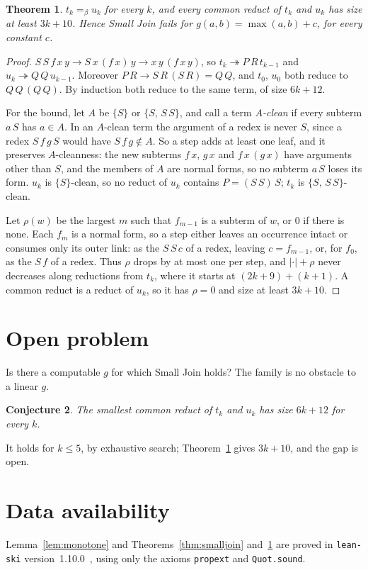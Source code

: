 \documentclass[11pt]{amsart}
\newtheorem{theorem}{Theorem}
\newtheorem{conjecture}[theorem]{Conjecture}
\theoremstyle{definition}
\newcommand{\conv}{=_{\beta}}
\newcommand{\sz}[1]{|#1|}
\begin{document}
\begin{theorem}\label{thm:lower}
$t_k\conv u_k$ for every $k$, and every common reduct of $t_k$ and $u_k$ has size at least $3k+10$.
Hence Small Join fails for $g(a,b)=\max(a,b)+c$, for every constant $c$.
\end{theorem}
\begin{proof}
$S\,S\,f\,x\,y\to S\,x\,(f\,x)\,y\to x\,y\,(f\,x\,y)$, so $t_k\twoheadrightarrow P\,R\,t_{k-1}$ and
$u_k\twoheadrightarrow Q\,Q\,u_{k-1}$. Moreover $P\,R\to S\,R\,(S\,R)=Q\,Q$, and $t_0$, $u_0$ both
reduce to $Q\,Q\,(Q\,Q)$. By induction both reduce to the same term, of size $6k+12$.

For the bound, let $A$ be $\{S\}$ or $\{S,\,S\,S\}$, and call a term \emph{$A$-clean} if every
subterm $a\,S$ has $a\in A$. In an $A$-clean term the argument of a redex is never $S$, since a
redex $S\,f\,g\,S$ would have $S\,f\,g\notin A$. So a step adds at least one leaf, and it preserves
$A$-cleanness: the new subterms $f\,x$, $g\,x$ and $f\,x\,(g\,x)$ have arguments other than $S$,
and the members of $A$ are normal forms, so no subterm $a\,S$ loses its form. $u_k$ is
$\{S\}$-clean, so no reduct of $u_k$ contains $P=(S\,S)\,S$; $t_k$ is $\{S,\,S\,S\}$-clean.

Let $\rho(w)$ be the largest $m$ such that $f_{m-1}$ is a subterm of $w$, or $0$ if there is none.
Each $f_m$ is a normal form, so a step either leaves an occurrence intact or consumes only its outer
link: as the $S\,S\,c$ of a redex, leaving $c=f_{m-1}$, or, for $f_0$, as the $S\,f$ of a redex. Thus $\rho$ drops by
at most one per step, and $\sz{\cdot}+\rho$ never decreases along reductions from $t_k$, where it
starts at $(2k+9)+(k+1)$. A common reduct is a reduct of $u_k$, so it has $\rho=0$ and size at
least $3k+10$.
\end{proof}

\section{Open problem}

Is there a computable $g$ for which Small Join holds? The family is no obstacle to a linear $g$.

\begin{conjecture}
The smallest common reduct of $t_k$ and $u_k$ has size $6k+12$ for every $k$.
\end{conjecture}

\noindent It holds for $k\le5$, by exhaustive search; Theorem~\ref{thm:lower} gives $3k+10$, and the gap is open.

\section*{Data availability}
Lemma~\ref{lem:monotone} and Theorems~\ref{thm:smalljoin} and~\ref{thm:lower} are proved in
\texttt{lean-ski} version~1.10.0~\citep{leanski}, using only the axioms \texttt{propext} and
\texttt{Quot.sound}.



\end{document}
